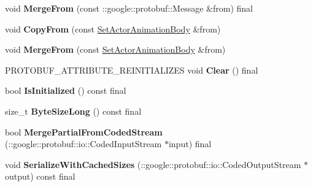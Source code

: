 \begin{DoxyCompactItemize}
void {\bfseries Merge\+From} (const \+::google\+::protobuf\+::\+Message \&from) final
\item 
\mbox{\label{classtbBasics_1_1SetActorAnimationBody_ad833a84d04620f9605288d6601d77c2b}} 
void {\bfseries Copy\+From} (const \hyperlink{classtbBasics_1_1SetActorAnimationBody}{Set\+Actor\+Animation\+Body} \&from)
\item 
\mbox{\label{classtbBasics_1_1SetActorAnimationBody_a33c86ddfba6eeaf84849f4d642706698}} 
void {\bfseries Merge\+From} (const \hyperlink{classtbBasics_1_1SetActorAnimationBody}{Set\+Actor\+Animation\+Body} \&from)
\item 
\mbox{\label{classtbBasics_1_1SetActorAnimationBody_a43f078e256c862d25849eb68472fb7a0}} 
P\+R\+O\+T\+O\+B\+U\+F\+\_\+\+A\+T\+T\+R\+I\+B\+U\+T\+E\+\_\+\+R\+E\+I\+N\+I\+T\+I\+A\+L\+I\+Z\+ES void {\bfseries Clear} () final
\item 
\mbox{\label{classtbBasics_1_1SetActorAnimationBody_ad99abf766ecb9f0b736bc24e5e7a215f}} 
bool {\bfseries Is\+Initialized} () const final
\item 
\mbox{\label{classtbBasics_1_1SetActorAnimationBody_aeafd7b0ee1209db0c80c14a78f934586}} 
size\+\_\+t {\bfseries Byte\+Size\+Long} () const final
\item 
\mbox{\label{classtbBasics_1_1SetActorAnimationBody_adc234e6ef9af9f8326352f731bb98b41}} 
bool {\bfseries Merge\+Partial\+From\+Coded\+Stream} (\+::google\+::protobuf\+::io\+::\+Coded\+Input\+Stream $\ast$input) final
\item 
\mbox{\label{classtbBasics_1_1SetActorAnimationBody_a6fb0c3776d4dfd55d6867e219786ec88}} 
void {\bfseries Serialize\+With\+Cached\+Sizes} (\+::google\+::protobuf\+::io\+::\+Coded\+Output\+Stream $\ast$output) const final
\item 
\mbox{\label{classtbBasics_1_1SetActorAnimationBody_ad034a35d7ea998e7e19ecfdcac477b42}} 

\end{DoxyCompactItemize}
